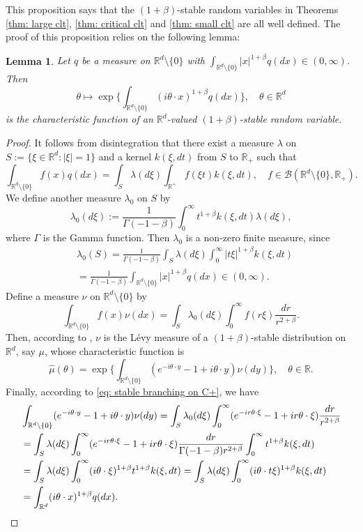 \documentclass[12pt,a4paper]{amsart}
\theoremstyle{plain}
\newtheorem{lem}[thm]{Lemma}
\theoremstyle{definition}
\numberwithin{equation}{section}
\begin{document}
This proposition says that the $(1+\beta)$-stable random variables  in Theorems \ref{thm: large clt}, \ref{thm: critical clt} and \ref{thm: small clt} are all well defined.
The proof of this proposition relies on the following lemma:
\begin{lem}
  \label{lem: charactreisticfunction}
  Let $q$ be a measure on $\mathbb R^d\setminus\{0\}$ with
  $\int_{\mathbb R^d\setminus\{0\}} |x|^{1+\beta} q(dx) \in (0,\infty)$.
  Then
  \[
    \theta 
    \mapsto  \exp\Big\{\int_{\mathbb R^d\setminus\{0\}} (i\theta \cdot x)^{1+\beta} q(dx)\Big\},
    \quad \theta \in \mathbb R^d
  \]
  is the characteristic function of an $\mathbb R^d$-valued $(1+\beta)$-stable random variable.
\end{lem}
\begin{proof}
  It follows from disintegration that there exist a measure $\lambda$ on $S:= \{\xi\in \mathbb R^d:|\xi| = 1\}$ and a kernel $k(\xi,dt)$ from $S$ to $\mathbb R_+$ such that
  \[
    \int_{\mathbb R^d\setminus \{0\}} f(x)q(dx) 
    = \int_S \lambda(d\xi) \int_{\mathbb R^+} f(\xi t)k(\xi,dt),\quad
    f\in \mathcal B(\mathbb R^d\setminus \{0\}, \mathbb R_+).
  \]
  We define another measure $\lambda_0$ on $S$ by
  \[
    \lambda_0(d\xi) 
    := \frac1{\Gamma(-1-\beta)}\int_0^\infty t^{1+\beta}k(\xi,dt) \lambda (d\xi),
  \]
  where $\Gamma$ is the Gamma function.
  Then $\lambda_0$ is a non-zero finite measure, since
  \begin{align}
    &\lambda_0(S) 
      = \frac{1}{\Gamma(-1-\beta)} \int_S \lambda (d\xi) \int_0^\infty |t\xi|^{1+\beta}k(\xi,dt) \\
    & = \frac{1}{\Gamma(-1-\beta)} \int_{\mathbb R^d\setminus\{0\}} |x|^{1+\beta} q(dx) \in (0,\infty).
  \end{align}
  Define a measure $\nu$ on $\mathbb R^d\setminus\{0\}$ by
  \[
    \int_{\mathbb R^d\setminus\{0\}}f(x)\nu(dx)
    = \int_{S} \lambda_0(d\xi) \int_0^\infty f(r\xi) \frac{dr}{r^{2+\beta}} .
  \]
  Then, according to \cite[Remark 14.4]{Sato2013Levy}, $\nu$ is the L\'evy measure of a $(1+\beta)$-stable distribution on $\mathbb R^d$, say $\mu$, whose characteristic function is
  \[
    \hat \mu(\theta)
    = \exp \Big \{ \int_{\mathbb R^d\setminus\{0\}} (e^{-i\theta \cdot y}-1+i\theta \cdot y) \nu(dy) \Big \}
    , \quad \theta \in \mathbb R.
  \]
  Finally, according to \eqref{eq: stable branching on C+}, we have
  \begin{align}
    & \int_{\mathbb R^d\setminus\{0\}} (e^{-i\theta \cdot y}-1+i\theta \cdot y) \nu(dy)
      = \int_S \lambda_0(d\xi) \int_0^\infty (e^{-ir\theta \cdot \xi}-1+ir\theta \cdot \xi) \frac{dr}{r^{2+\beta}} \\
    & = \int_S \lambda (d\xi) \int_0^\infty (e^{-ir\theta \cdot \xi}-1+ir\theta \cdot \xi) \frac{dr}{\Gamma(-1-\beta)r^{2+\beta}}\int_0^\infty t^{1+\beta} k(\xi,dt) \\
    & = \int_S \lambda (d\xi) \int_0^\infty (i\theta\cdot \xi)^{1+\beta} t^{1+\beta} k(\xi,dt)
      = \int_S \lambda(d\xi) \int_0^\infty (i\theta \cdot t\xi)^{1+\beta} k(\xi,dt) \\
    & = \int_{\mathbb R^d} (i\theta \cdot x)^{1+\beta} q(dx).
      \qedhere
  \end{align}
\end{proof}
\end{document}
